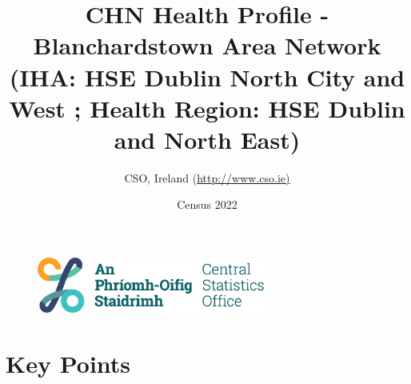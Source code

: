 \documentclass{article}
\title{CHN Health Profile - Blanchardstown Area Network (IHA: HSE Dublin North City and West ;  Health Region: HSE Dublin and North East) }
\date{Census 2022}
\author{CSO, Ireland  (\url{http://www.cso.ie)}}
\begin{document}


\begin{figure}
	\centering
\includegraphics[width =75mm]{../figures/CSO_Logo.png}
\end{figure}

				 
		   
						  
														  
																																													
												 
			 
\maketitle
					
													   
				 
						 
																																																																											   
				 
				  
  \pagebreak
    	    \tableofcontents

\pagebreak


\section{Key Points}
\end{document}
